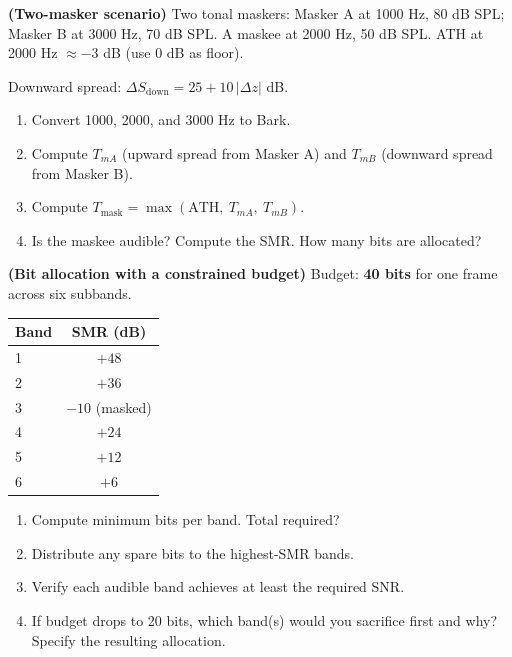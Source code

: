 \begin{exercisebox}
\textbf{(Two-masker scenario)}
Two tonal maskers: Masker A at 1000 Hz, 80 dB SPL; Masker B at 3000 Hz, 70 dB SPL. A maskee at 2000 Hz, 50 dB SPL. ATH at 2000 Hz $\approx -3$ dB (use 0 dB as floor).

Downward spread: $\Delta S_{\text{down}} = 25 + 10\,|\Delta z|$ dB.
\begin{enumerate}[nosep, label=(\alph*)]
  \item Convert 1000, 2000, and 3000 Hz to Bark.
  \item Compute $T_{mA}$ (upward spread from Masker A) and $T_{mB}$ (downward spread from Masker B).
  \item Compute $T_{\text{mask}} = \max(\text{ATH},\ T_{mA},\ T_{mB})$.
  \item Is the maskee audible? Compute the SMR. How many bits are allocated?
\end{enumerate}
\end{exercisebox}

\begin{exercisebox}
\textbf{(Bit allocation with a constrained budget)}
Budget: \textbf{40 bits} for one frame across six subbands.

\begin{center}
\begin{tabular}{lc}
\toprule
Band & SMR (dB) \\ \midrule
1 & $+48$ \\ 2 & $+36$ \\ 3 & $-10$ (masked) \\ 4 & $+24$ \\ 5 & $+12$ \\ 6 & $+6$ \\
\bottomrule
\end{tabular}
\end{center}

\begin{enumerate}[nosep, label=(\alph*)]
  \item Compute minimum bits per band. Total required?
  \item Distribute any spare bits to the highest-SMR bands.
  \item Verify each audible band achieves at least the required SNR.
  \item If budget drops to 20 bits, which band(s) would you sacrifice first and why? Specify the resulting allocation.
\end{enumerate}
\end{exercisebox}

